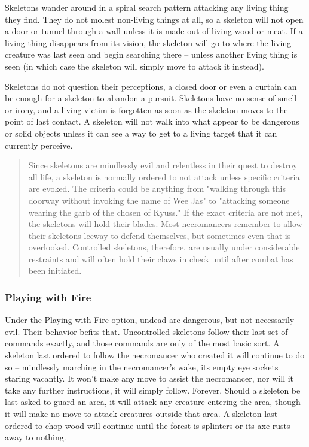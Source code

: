 Skeletons wander around in a spiral search pattern attacking any living thing they find. They do not molest non-living things at all, so a skeleton will not open a door or tunnel through a wall unless it is made out of living wood or meat. If a living thing disappears from its vision, the skeleton will go to where the living creature was last seen and begin searching there -- unless another living thing is seen (in which case the skeleton will simply move to attack it instead).

Skeletons do not question their perceptions, a closed door or even a curtain can be enough for a skeleton to abandon a pursuit. Skeletons have no sense of smell or irony, and a living victim is forgotten as soon as the skeleton moves to the point of last contact. A skeleton will not walk into what appear to be dangerous or solid objects unless it can see a way to get to a living target that it can currently perceive.

\begin{quote}

Since skeletons are mindlessly evil and relentless in their quest to destroy all life, a skeleton is normally ordered to not attack unless specific criteria are evoked. The criteria could be anything from "walking through this doorway without invoking the name of Wee Jas" to "attacking someone wearing the garb of the chosen of Kyuss." If the exact criteria are not met, the skeletons will hold their blades. Most necromancers remember to allow their skeletons leeway to defend themselves, but sometimes even that is overlooked. Controlled skeletons, therefore, are usually under considerable restraints and will often hold their claws in check until after combat has been initiated.
\end{quote}

\subsubsection{Playing with Fire}

Under the Playing with Fire option, undead are dangerous, but not necessarily evil. Their behavior befits that. Uncontrolled skeletons follow their last set of commands exactly, and those commands are only of the most basic sort. A skeleton last ordered to follow the necromancer who created it will continue to do so -- mindlessly marching in the necromancer's wake, its empty eye sockets staring vacantly. It won't make any move to assist the necromancer, nor will it take any further instructions, it will simply follow. Forever. Should a skeleton be last asked to guard an area, it will attack any creature entering the area, though it will make no move to attack creatures outside that area. A skeleton last ordered to chop wood will continue until the forest is splinters or its axe rusts away to nothing.

